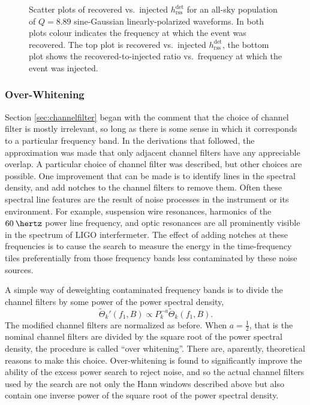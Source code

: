 \documentclass{article}
\begin{document}
\begin{figure}
\begin{center}
\end{center}
\caption{Scatter plots of recovered vs.\ injected
\(h_{\text{rss}}^{\text{det}}\) for an all-sky population of \(Q = 8.89\)
sine-Gaussian linearly-polarized waveforms.  In both plots colour indicates
the frequency at which the event was recovered.  The top plot is recovered
vs.\ injected \(h_{\text{rss}}^{\text{det}}\), the bottom plot shows the
recovered-to-injected ratio vs.\ frequency at which the event was
injected.}
\label{fig:h_rec_vs_inj}
\end{figure}


\subsubsection{Over-Whitening}


Section \ref{sec:channelfilter} began with the comment that the choice of
channel filter is mostly irrelevant, so long as there is some sense in
which it corresponds to a particular frequency band.  In the derivations
that followed, the approximation was made that only adjacent channel
filters have any appreciable overlap.  A particular choice of channel
filter was described, but other choices are possible.  One improvement that
can be made is to identify lines in the spectral density, and add notches
to the channel filters to remove them.  Often these spectral line features
are the result of noise processes in the instrument or its environment.
For example, suspension wire resonances, harmonics of the
\(\unit{60}{\hertz}\) power line frequency, and optic resonances are all
prominently visible in the spectrum of LIGO interfermeter.  The effect of
adding notches at these frequencies is to cause the search to measure the
energy in the time-frequency tiles preferentially from those frequency
bands less contaminated by these noise sources.

A simple way of deweighting contaminated frequency bands is to divide the
channel filters by some power of the power spectral density,
\begin{equation}
\tilde{\Theta}_{k}'(f_{1}, B)
   \propto P_{k}^{-a} \tilde{\Theta}_{k}(f_{1}, B).
\end{equation}
The modified channel filters are normalized as before.  When \(a =
\frac{1}{2}\), that is the nominal channel filters are divided by the
square root of the power spectral density, the procedure is called ``over
whitening''.  There are, aparently, theoretical reasons to make this
choice.  Over-whitening is found to significantly improve the ability of
the excess power search to reject noise, and so the actual channel filters
used by the search are not only the Hann windows described above but also
contain one inverse power of the square root of the power spectral density.
\end{document}
